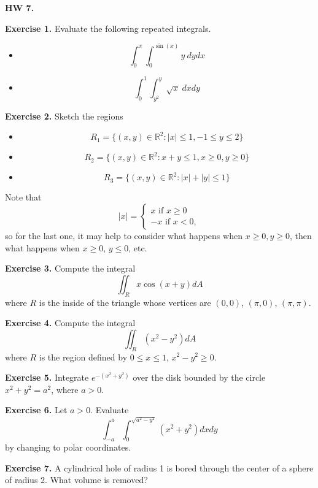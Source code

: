 \documentclass{article}
\begin{document}

\textbf{HW 7.}

\textbf{Exercise 1.} Evaluate the following repeated integrals.
\begin{itemize}
    \item \[\int_0^\pi \int_0^{\sin(x)} y\ dy dx\]
    \item \[\int_0^1 \int_{y^2}^y \sqrt{x}\ dx dy\]
\end{itemize}

\textbf{Exercise 2.} Sketch the regions
\begin{itemize}
    \item \[R_1 = \{ (x,y) \in \mathbb{R}^2 : |x| \leq 1, -1 \leq y \leq 2\}\]
    \item \[R_2 = \{ (x,y) \in \mathbb{R}^2 : x + y \leq 1, x \geq 0, y \geq 0\}\]
    \item \[R_3 = \{ (x,y) \in \mathbb{R}^2 : |x|+|y| \leq 1 \}\]
\end{itemize}
Note that 
\[|x| = \begin{cases}
    x \text{ if } x\geq 0\\
    -x \text{ if } x < 0,
\end{cases}\]
so for the last one, it may help to consider what happens when $x \geq 0, y \geq 0$, then what happens when $x \geq 0$, $y \leq 0$, etc.

\textbf{Exercise 3.} Compute the integral 
\[\iint_R x\cos(x+y) dA\]
where $R$ is the inside of the triangle whose vertices are $(0,0)$, $(\pi,0)$, $(\pi,\pi)$.


\textbf{Exercise 4.} Compute the integral 
\[\iint_R (x^2-y^2)dA \]
where $R$ is the region defined by $0 \leq x \leq 1$, $x^2 - y^2 \geq 0$.

\textbf{Exercise 5.} Integrate $e^{-(x^2+y^2)}$ over the disk bounded by the circle $x^2 + y^2 = a^2$, 
where $a>0$.

\textbf{Exercise 6.} Let $a > 0$. Evaluate 
\[ \int_{-a}^a \int_{0}^{\sqrt{a^2-y^2}} (x^2 + y^2) dx dy\]
by changing to polar coordinates.

\textbf{Exercise 7.} A cylindrical hole of radius 1 is bored through the center of a sphere of radius 2.
What volume is removed?
\end{document}
